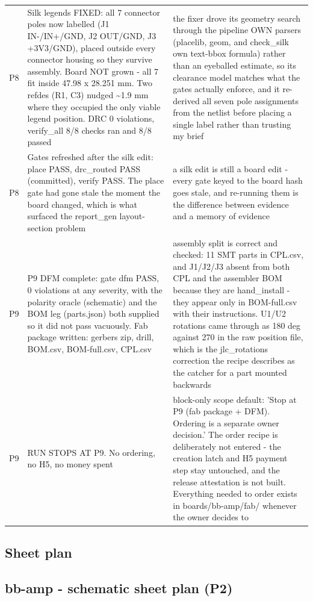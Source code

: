 \documentclass[11pt,a4paper]{article}
\begin{document}
{\begin{longtable}{lp{5.2cm}p{7.2cm}}
P8 & Silk legends FIXED: all 7 connector poles now labelled (J1 IN-/IN+/GND, J2 OUT/GND, J3 +3V3/GND), placed outside every connector housing so they survive assembly. Board NOT grown - all 7 fit inside 47.98 x 28.251 mm. Two refdes (R1, C3) nudged \textasciitilde{}1.9 mm where they occupied the only viable legend position. DRC 0 violations, verify\_all 8/8 checks ran and 8/8 passed & the fixer drove its geometry search through the pipeline OWN parsers (placelib, geom, and check\_silk own text-bbox formula) rather than an eyeballed estimate, so its clearance model matches what the gates actually enforce, and it re-derived all seven pole assignments from the netlist before placing a single label rather than trusting my brief \\
P8 & Gates refreshed after the silk edit: place PASS, drc\_routed PASS (committed), verify PASS. The place gate had gone stale the moment the board changed, which is what surfaced the report\_gen layout-section problem & a silk edit is still a board edit - every gate keyed to the board hash goes stale, and re-running them is the difference between evidence and a memory of evidence \\
P9 & P9 DFM complete: gate dfm PASS, 0 violations at any severity, with the polarity oracle (schematic) and the BOM leg (parts.json) both supplied so it did not pass vacuously. Fab package written: gerbers zip, drill, BOM.csv, BOM-full.csv, CPL.csv & assembly split is correct and checked: 11 SMT parts in CPL.csv, and J1/J2/J3 absent from both CPL and the assembler BOM because they are hand\_install - they appear only in BOM-full.csv with their instructions. U1/U2 rotations came through as 180 deg against 270 in the raw position file, which is the jlc\_rotations correction the recipe describes as the catcher for a part mounted backwards \\
P9 & RUN STOPS AT P9. No ordering, no H5, no money spent & block-only scope default: 'Stop at P9 (fab package + DFM). Ordering is a separate owner decision.' The order recipe is deliberately not entered - the creation latch and H5 payment step stay untouched, and the release attestation is not built. Everything needed to order exists in boards/bb-amp/fab/ whenever the owner decides to \\
\bottomrule
\end{longtable}
}
\subsection*{Sheet plan}
\subsection*{bb-amp - schematic sheet plan (P2)}
\end{document}
